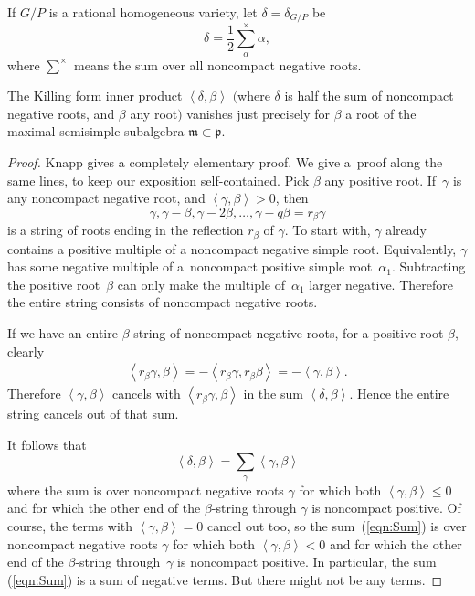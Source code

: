 \documentclass[pdftex]{sigma}
\newcommand{\gstruc}{\mathfrak{p}}
\begin{document}
\begin{definition}
If $G/P$ is a rational homogeneous variety,
let $\delta = \delta_{G/P}$ be
\[
\delta = \frac{1}{2} \sum_{\alpha}^{\times} \alpha,
\]
where $\sum^{\times}$ means the sum over all noncompact negative roots.
\end{definition}

\begin{lemma}
The Killing form inner product
\(
\left<\delta, \beta\right>
\)
$($where $\delta$ is half the sum of noncompact negative roots, and $\beta$
any root$)$ vanishes
just precisely for $\beta$ a root of the
maximal semisimple subalgebra $\mathfrak{m} \subset \gstruc$.
\end{lemma}
\begin{proof} Knapp \cite[Corollary 5.100, p.~330]{Knapp:2002}
gives a completely elementary proof. We give a~proof along
the same lines, to keep our exposition self-contained.
Pick $\beta$ any positive root. If~$\gamma$ is any
noncompact negative root, and $\left<\gamma,\beta\right> > 0$,
then
\[
\gamma, \gamma-\beta, \gamma-2   \beta, \dots, \gamma-q   \beta = r_{\beta} \gamma
\]
is a string of roots ending in the ref\/lection $r_{\beta}$ of $\gamma$.
To start with, $\gamma$ already contains a positive
multiple of a noncompact negative simple root. Equivalently, $\gamma$
has some negative multiple of a~noncompact positive simple root~$\alpha_1$.
Subtracting the positive
root~$\beta$ can only make the multiple of~$\alpha_1$
larger negative. Therefore the entire string consists
of noncompact negative roots.

If we have an entire $\beta$-string of noncompact
negative roots, for a positive
root $\beta$, clearly
\begin{gather*}
\left<r_{\beta} \gamma,\beta\right>
 = -\left<r_{\beta} \gamma, r_{\beta} \beta\right>
 =
-\left<\gamma,\beta\right>.
\end{gather*}
Therefore $\left<\gamma,\beta\right>$ cancels with $\left<r_{\beta}
\gamma,\beta\right>$ in the sum $\left<\delta,\beta\right>$. Hence
the entire string cancels out of that sum.

It follows that
\begin{equation}\label{eqn:Sum}
\left<\delta,\beta\right>=
\sum_{\gamma} \left<\gamma,\beta\right>
\end{equation}
where the sum is over noncompact negative roots $\gamma$
for which both $\left<\gamma,\beta\right> \le 0$
and for which the other end of the $\beta$-string
through $\gamma$ is noncompact positive.
Of course, the terms with  $\left<\gamma,\beta\right> = 0$
cancel out too, so the sum~(\ref{eqn:Sum}) is over
noncompact negative roots $\gamma$ for
which both $\left<\gamma,\beta\right> < 0$
and for which the other end of the $\beta$-string
through~$\gamma$ is noncompact positive. In particular,
the sum (\ref{eqn:Sum}) is a sum of negative terms.
But there might not be any terms.


\end{proof}
\end{document}
